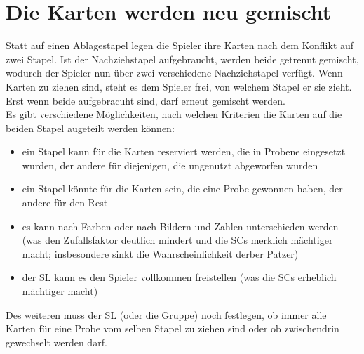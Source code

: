 \section{Die Karten werden neu gemischt}
Statt auf einen Ablagestapel legen die Spieler ihre Karten nach dem Konflikt auf zwei Stapel. Ist der Nachziehstapel aufgebraucht, werden beide getrennt gemischt, wodurch der Spieler nun über zwei verschiedene Nachziehstapel verfügt. Wenn Karten zu ziehen sind, steht es dem Spieler frei, von welchem Stapel er sie zieht. Erst wenn beide aufgebracuht sind, darf erneut gemischt werden.
\\
Es gibt verschiedene Möglichkeiten, nach welchen Kriterien die Karten auf die beiden Stapel augeteilt werden können:
\begin{itemize}
\item ein Stapel kann für die Karten reserviert werden, die in Probene eingesetzt wurden, der andere für diejenigen, die ungenutzt abgeworfen wurden
\item ein Stapel könnte für die Karten sein, die eine Probe gewonnen haben, der andere für den Rest
\item es kann nach Farben oder nach Bildern und Zahlen unterschieden werden (was den Zufallsfaktor deutlich mindert und die SCs merklich mächtiger macht; insbesondere sinkt die Wahrscheinlichkeit derber Patzer)
\item der SL kann es den Spieler vollkommen freistellen (was die SCs erheblich mächtiger macht)
\end{itemize}
Des weiteren muss der SL (oder die Gruppe) noch festlegen, ob immer alle Karten für eine Probe vom selben Stapel zu ziehen sind oder ob zwischendrin gewechselt werden darf.

